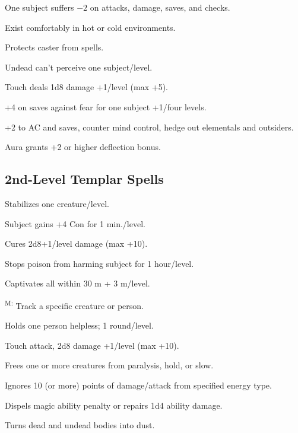  One subject suffers $-2$ on attacks, damage, saves, and checks.

 Exist comfortably in hot or cold environments.

 Protects caster from spells.

 Undead can't perceive one subject/level.

 Touch deals 1d8 damage +1/level (max +5).

 +4 on saves against fear for one subject +1/four levels.

 +2 to AC and saves, counter mind control, hedge out elementals and outsiders.

 Aura grants +2 or higher deflection bonus.



\subsection{2nd-Level Templar Spells}

 Stabilizes one creature/level.

 Subject gains +4 Con for 1 min./level.

 Cures 2d8+1/level damage (max +10).

 Stops poison from harming subject for 1 hour/level.

 Captivates all within 30 m + 3 m/level.

\textsuperscript{M:} Track a specific creature or person.

 Holds one person helpless; 1 round/level.

 Touch attack, 2d8 damage +1/level (max +10).

 Frees one or more creatures from paralysis, hold, or slow.

 Ignores 10 (or more) points of damage/attack from specified energy type.

 Dispels magic ability penalty or repairs 1d4 ability damage.

 Turns dead and undead bodies into dust.

